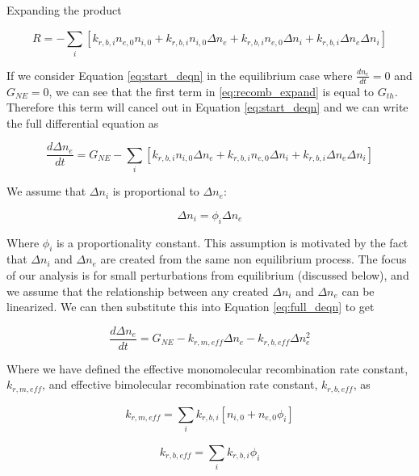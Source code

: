 Expanding the product

\begin{equation}
  \label{eq:recomb_expand}
  R = - \sum_{i}^{}[k_{r, b, i}n_{e,0}n_{i,0}  + k_{r, b, i}n_{i,0}\Delta n_{e} + k_{r, b, i}n_{e,0}\Delta n_{i} + k_{r, b, i}\Delta n_{e}\Delta n_{i}]
\end{equation}


If we consider Equation \ref{eq:start_deqn} in the equilibrium case where $\frac{dn_{e}}{dt} = 0$ and $G_{NE} = 0$, we can see that the first term in \ref{eq:recomb_expand} is equal to $G_{th}$. Therefore this term will cancel out in Equation \ref{eq:start_deqn} and we can write the full differential equation as

\begin{equation}
  \label{eq:full_deqn}
\frac{d\Delta n_{e}}{dt} = G_{NE}  -  \sum_{i}^{}[k_{r, b, i}n_{i,0}\Delta n_{e} + k_{r, b, i}n_{e,0}\Delta n_{i} + k_{r, b, i}\Delta n_{e}\Delta n_{i}]
\end{equation}

We assume that $\Delta n_i$ is proportional to $\Delta n_e$:

\begin{equation}
  \label{eq:phi_def}
\Delta n_i = \phi_i \Delta n_{e}
\end{equation}

Where $\phi_i$ is a proportionality constant. This assumption is motivated by the fact that $\Delta n_i$ and $\Delta n_e$ are created from the same non equilibrium process. The focus of our analysis is for small perturbations from equilibrium (discussed below), and we assume that the relationship between any created $\Delta n_i$ and $\Delta n_e$ can be linearized. We can then substitute this into Equation \ref{eq:full_deqn} to get

\begin{equation}
  \label{eq:full_deqn_phi}
\frac{d\Delta n_{e}}{dt} = G_{NE} - k_{r, m, eff}\Delta n_{e} - k_{r, b, eff} \Delta n_{e}^2
\end{equation}

Where we have defined the effective monomolecular recombination rate constant, $k_{r, m, eff}$, and effective bimolecular recombination rate constant, $k_{r, b, eff}$, as


\begin{equation}
\label{eq:krm_eff_def}
k_{r, m, eff} = \sum_{i}^{}k_{r, b, i}[n_{i,0} + n_{e,0}\phi_i]
\end{equation}

\begin{equation}
\label{eq:krb_eff_def}
k_{r, b, eff} = \sum_{i}^{}k_{r, b, i}\phi_i
\end{equation}


